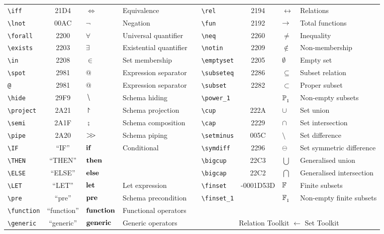 \begin{tabular}{lcllllcll}
\verb'\iff' & 21D4 & $\iff$ & Equivalence &  & \verb'\rel' & 2194 & $\rel$ & Relations \\
\verb'\lnot' & 00AC & $\lnot$ & Negation &  & \verb'\fun' & 2192 & $\fun$ & Total functions \\
\verb'\forall' & 2200 & $\forall$ & Universal quantifier &  & \verb'\neq' & 2260 & $\neq$ & Inequality \\
\verb'\exists' & 2203 & $\exists$ & Existential quantifier &  & \verb'\notin' & 2209 & $\notin$ & Non-membership \\
\verb'\in' & 2208 & $\in$ & Set membership &  & \verb'\emptyset' & 2205 & $\emptyset$ & Empty set \\
\verb'\spot' & 2981 & $@$ & Expression separator &  & \verb'\subseteq' & 2286 & $\subseteq$ & Subset relation \\
\verb'@' & 2981 & $@$ & Expression separator &  & \verb'\subset' & 2282 & $\subset$ & Proper subset \\
\verb'\hide' & 29F9 & $\hide$ & Schema hiding &  & \verb'\power_1' &  & $\power_1$ & Non-empty subsets \\
\verb'\project' & 2A21 & $\project$ & Schema projection &  & \verb'\cup' & 222A & $\cup$ & Set union \\
\verb'\semi' & 2A1F & $\semi$ & Schema composition &  & \verb'\cap' & 2229 & $\cap$ & Set intersection \\
\verb'\pipe' & 2A20 & $\pipe$ & Schema piping &  & \verb'\setminus' & 005C & $\setminus$ & Set difference \\
\verb'\IF' & ``IF'' & $\IF$ & Conditional &  & \verb'\symdiff' & 2296 & $\symdiff$ & Set symmetric difference \\
\verb'\THEN' & ``THEN'' & $\THEN$ &  &  & \verb'\bigcup' & 22C3 & $\bigcup$ & Generalised union \\
\verb'\ELSE' & ``ELSE'' & $\ELSE$ &  &  & \verb'\bigcap' & 22C2 & $\bigcap$ & Generalised intersection \\
\verb'\LET' & ``LET'' & $\LET$ & Let expression &  & \verb'\finset' & -0001D53D & $\finset$ & Finite subsets \\
\verb'\pre' & ``pre'' & $\pre$ & Schema precondition &  & \verb'\finset_1' &  & $\finset_1$ & Non-empty finite subsets \\
\verb'\function' & ``function'' & $\function$ & Functional operators &  &  &  &  &  \\
\cline{6-9}
\verb'\generic' & ``generic'' & $\generic$ & Generic operators & \multicolumn{1}{l|}{} & \multicolumn{4}{c|}{Relation Toolkit $\leftarrow$ Set Toolkit} \\

\end{tabular}
